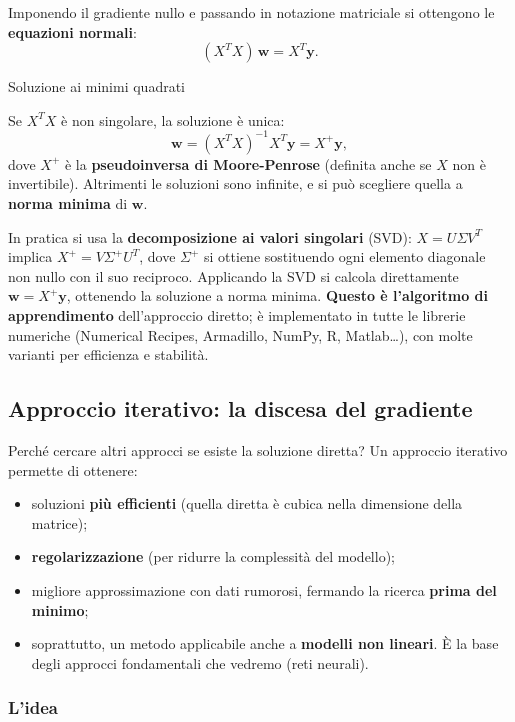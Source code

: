 Imponendo il gradiente nullo e passando in notazione matriciale si
ottengono le \textbf{equazioni normali}: \[
(X^T X)\,\mathbf{w} = X^T \mathbf{y}.
\]

\begin{boxtheorem}{Soluzione ai minimi quadrati}

Se \(X^TX\) è non singolare, la soluzione è unica: \[
\mathbf{w} = (X^TX)^{-1}X^T\mathbf{y} = X^+\mathbf{y},
\] dove \(X^+\) è la \textbf{pseudoinversa di Moore-Penrose} (definita
anche se \(X\) non è invertibile). Altrimenti le soluzioni sono
infinite, e si può scegliere quella a \textbf{norma minima} di
\(\mathbf{w}\).

\end{boxtheorem}

In pratica si usa la \textbf{decomposizione ai valori singolari} (SVD):
\(X = U\Sigma V^T\) implica \(X^+ = V\Sigma^+U^T\), dove \(\Sigma^+\) si
ottiene sostituendo ogni elemento diagonale non nullo con il suo
reciproco. Applicando la SVD si calcola direttamente
\(\mathbf{w} = X^+\mathbf{y}\), ottenendo la soluzione a norma minima.
\textbf{Questo è l'algoritmo di apprendimento} dell'approccio diretto; è
implementato in tutte le librerie numeriche (Numerical Recipes,
Armadillo, NumPy, R, Matlab\ldots), con molte varianti per efficienza e
stabilità.

\subsection{Approccio iterativo: la discesa del
gradiente}\label{approccio-iterativo-la-discesa-del-gradiente}

Perché cercare altri approcci se esiste la soluzione diretta? Un
approccio iterativo permette di ottenere:

\begin{itemize}
\tightlist
\item
  soluzioni \textbf{più efficienti} (quella diretta è cubica nella
  dimensione della matrice);
\item
  \textbf{regolarizzazione} (per ridurre la complessità del modello);
\item
  migliore approssimazione con dati rumorosi, fermando la ricerca
  \textbf{prima del minimo};
\item
  soprattutto, un metodo applicabile anche a \textbf{modelli non
  lineari}. È la base degli approcci fondamentali che vedremo (reti
  neurali).
\end{itemize}

\subsubsection{L'idea}\label{lidea}

